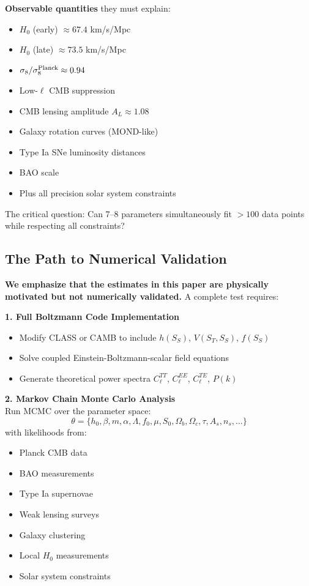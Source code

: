 \documentclass[12pt]{article}
\begin{document}
\textbf{Observable quantities} they must explain:
\begin{itemize}
    \item $H_0$ (early) $\approx 67.4$ km/s/Mpc
    \item $H_0$ (late) $\approx 73.5$ km/s/Mpc
    \item $\sigma_8/\sigma_8^{\rm Planck} \approx 0.94$
    \item Low-$\ell$ CMB suppression
    \item CMB lensing amplitude $A_L \approx 1.08$
    \item Galaxy rotation curves (MOND-like)
    \item Type Ia SNe luminosity distances
    \item BAO scale
    \item Plus all precision solar system constraints
\end{itemize}

The critical question: Can 7--8 parameters simultaneously fit $>100$ data points while respecting all constraints?

\subsection{The Path to Numerical Validation}

\textbf{We emphasize that the estimates in this paper are physically motivated but not numerically validated.} A complete test requires:

\textbf{1. Full Boltzmann Code Implementation}
\begin{itemize}
    \item Modify CLASS or CAMB to include $h(S_S)$, $V(S_T, S_S)$, $f(S_S)$
    \item Solve coupled Einstein-Boltzmann-scalar field equations
    \item Generate theoretical power spectra $C_\ell^{TT}$, $C_\ell^{EE}$, $C_\ell^{TE}$, $P(k)$
\end{itemize}

\textbf{2. Markov Chain Monte Carlo Analysis}\\
Run MCMC over the parameter space:
\begin{equation}
    \theta = \{ h_0, \beta, m, \alpha, \Lambda, f_0, \mu, S_0, \Omega_b, \Omega_c, \tau, A_s, n_s, \ldots \}
\end{equation}
with likelihoods from:
\begin{itemize}
    \item Planck CMB data
    \item BAO measurements
    \item Type Ia supernovae
    \item Weak lensing surveys
    \item Galaxy clustering
    \item Local $H_0$ measurements
    \item Solar system constraints
\end{itemize}
\end{document}
